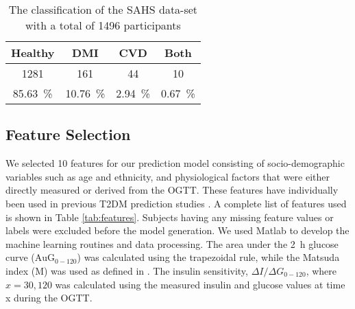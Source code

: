 \documentclass[a4paper,twoside]{article}
\begin{document}
\begin{table}[!htbp]
\centering
\begin{tabular}{c c c c}
\toprule
Healthy &  DMI & CVD & Both\\
\midrule \midrule
1281 & 161 & 44 & 10\\
\SI{85.63}{\percent} & \SI{10.76}{\percent} & \SI[round-precision=3]{2.94}{\percent} & \SI[round-precision=2]{0.67}{\percent} \\
\bottomrule
\end{tabular}
\caption{The classification of the SAHS data-set with a total of 1496 participants }
\label{tab:patients}
\end{table}
% 
% 
\subsection{Feature Selection}
% 
We selected \num{10} features for our prediction model consisting of socio-demographic variables such as age and ethnicity, and physiological factors that were either directly measured or derived from the OGTT. These features have individually been used in previous T2DM prediction studies \cite{abdul-ghani_what_2007,abdul-ghani_plasma_2009}. A complete list of features used is shown in Table \ref{tab:features}. Subjects having any missing feature values or labels were excluded before the model generation. We used Matlab to develop the machine learning routines and data processing.  The area under the \SI{2}{\hour} glucose curve ($\textrm{AuG}_{0-120}$) was calculated using the trapezoidal rule, while the Matsuda index (M) was used as defined in \cite{Matsuda1462}. The insulin sensitivity, \( {\Delta I}/{\Delta G}_{0-120} \), where $x = 30, 120$ was calculated using the measured insulin and glucose values at time x during the OGTT.
\end{document}
